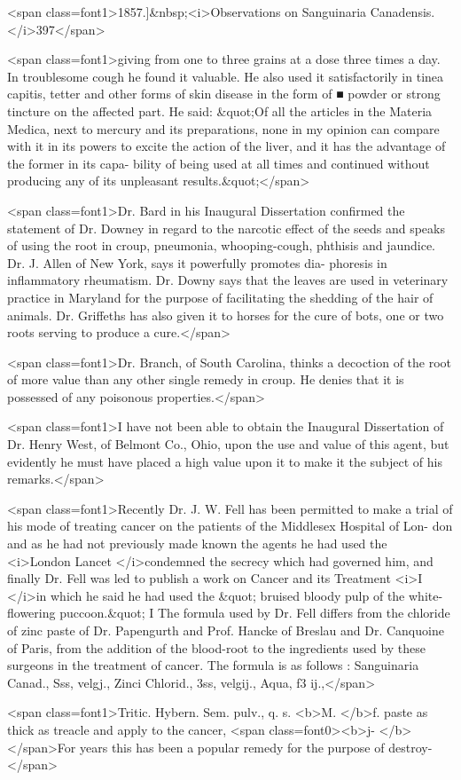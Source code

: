 <span class=font1>1857.]&nbsp;<i>Observations on Sanguinaria Canadensis. </i>397</span>

<span class=font1>giving from one to three grains at a dose three times a day. In
troublesome cough he found it valuable. He also used it satisfactorily
in tinea capitis, tetter and other forms of skin disease in the form of
■ powder or strong tincture on the affected part. He said: &quot;Of all
the articles in the Materia Medica, next to mercury and its preparations,
none in my opinion can compare with it in its powers to excite the
action of the liver, and it has the advantage of the former in its capa-
bility of being used at all times and continued without producing any
of its unpleasant results.&quot;</span>

<span class=font1>Dr. Bard in his Inaugural Dissertation confirmed the statement of
Dr. Downey in regard to the narcotic effect of the seeds and speaks
of using the root in croup, pneumonia, whooping-cough, phthisis and
jaundice. Dr. J. Allen of New York, says it powerfully promotes dia-
phoresis in inflammatory rheumatism. Dr. Downy says that the leaves
are used in veterinary practice in Maryland for the purpose of facilitating
the shedding of the hair of animals. Dr. Griffeths has also given it to
horses for the cure of bots, one or two roots serving to produce a cure.</span>

<span class=font1>Dr. Branch, of South Carolina, thinks a decoction of the root of
more value than any other single remedy in croup. He denies that it
is possessed of any poisonous properties.</span>

<span class=font1>I have not been able to obtain the Inaugural Dissertation of Dr.
Henry West, of Belmont Co., Ohio, upon the use and value of this
agent, but evidently he must have placed a high value upon it to make
it the subject of his remarks.</span>

<span class=font1>Recently Dr. J. W. Fell has been permitted to make a trial of his
mode of treating cancer on the patients of the Middlesex Hospital of Lon-
don and as he had not previously made known the agents he had used
the <i>London Lancet </i>condemned the secrecy which had governed him, and
finally Dr. Fell was led to publish a work on Cancer and its Treatment
<i>I   </i>in which he said he had used the &quot; bruised bloody pulp of the white-
flowering puccoon.&quot;
I      The formula used by Dr. Fell differs from the chloride of zinc
paste of Dr. Papengurth and Prof. Hancke of Breslau and Dr. Canquoine
of Paris, from the addition of the blood-root to the ingredients used by
these surgeons in the treatment of cancer.   The formula is as follows :
Sanguinaria Canad., Sss, velgj.,
Zinci Chlorid., 3ss, velgij.,
Aqua, f3 ij.,</span>

<span class=font1>Tritic. Hybern. Sem. pulv., q. s.
<b>M. </b>f. paste as thick as treacle and apply to the cancer,
<span class=font0><b>j-      </b></span>For years this has been a popular remedy for the purpose of destroy-</span>\endinput
